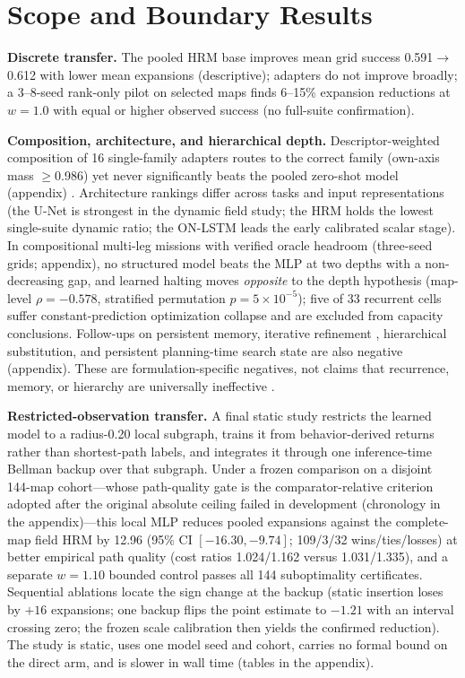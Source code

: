 \documentclass[letterpaper]{article} %
\begin{document}
\section{Scope and Boundary Results}

\textbf{Discrete transfer.} The pooled HRM base improves mean grid success 0.591$\to$0.612 with lower mean expansions (descriptive); adapters do not improve broadly; a 3--8-seed rank-only pilot on selected maps finds 6--15\% expansion reductions at $w{=}1.0$ with equal or higher observed success (no full-suite confirmation).

\textbf{Composition, architecture, and hierarchical depth.} Descriptor-weighted composition of 16 single-family adapters routes to the correct family (own-axis mass $\geq$0.986) yet never significantly beats the pooled zero-shot model (appendix) \citep{wortsman2022soups,ilharco2022task}. Architecture rankings differ across tasks and input representations (the U-Net is strongest in the dynamic field study; the HRM holds the lowest single-suite dynamic ratio; the ON-LSTM leads the early calibrated scalar stage). In compositional multi-leg missions with verified oracle headroom (three-seed grids; appendix), no structured model beats the MLP at two depths with a non-decreasing gap, and learned halting moves \emph{opposite} to the depth hypothesis (map-level $\rho=-0.578$, stratified permutation $p=5\times10^{-5}$); five of 33 recurrent cells suffer constant-prediction optimization collapse and are excluded from capacity conclusions. Follow-ups on persistent memory, iterative refinement \citep{tamar2016vin,lee2018gppn}, hierarchical substitution, and persistent planning-time search state are also negative (appendix). These are formulation-specific negatives, not claims that recurrence, memory, or hierarchy are universally ineffective \citep{jolicoeur2025trm,czechowski2021subgoal}.

\textbf{Restricted-observation transfer.} A final static study restricts the learned model to a radius-0.20 local subgraph, trains it from behavior-derived returns rather than shortest-path labels, and integrates it through one inference-time Bellman backup over that subgraph. Under a frozen comparison on a disjoint 144-map cohort---whose path-quality gate is the comparator-relative criterion adopted after the original absolute ceiling failed in development (chronology in the appendix)---this local MLP reduces pooled expansions against the complete-map field HRM by 12.96 (95\% CI $[-16.30,-9.74]$; 109/3/32 wins/ties/losses) at better empirical path quality (cost ratios 1.024/1.162 versus 1.031/1.335), and a separate $w{=}1.10$ bounded control passes all 144 suboptimality certificates. Sequential ablations locate the sign change at the backup (static insertion loses by $+16$ expansions; one backup flips the point estimate to $-1.21$ with an interval crossing zero; the frozen scale calibration then yields the confirmed reduction). The study is static, uses one model seed and cohort, carries no formal bound on the direct arm, and is slower in wall time (tables in the appendix).
\end{document}
